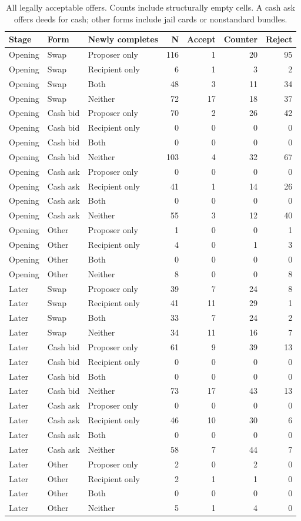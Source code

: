 \begin{longtable}{@{}lllrrrr@{}}
\caption{All legally acceptable offers. Counts include structurally empty cells. A cash ask offers deeds for cash; other forms include jail cards or nonstandard bundles.}\label{tab:full-offers}\\
\toprule Stage & Form & Newly completes & N & Accept & Counter & Reject\\\midrule\endhead
Opening & Swap & Proposer only & 116 & 1 & 20 & 95 \\
Opening & Swap & Recipient only & 6 & 1 & 3 & 2 \\
Opening & Swap & Both & 48 & 3 & 11 & 34 \\
Opening & Swap & Neither & 72 & 17 & 18 & 37 \\
Opening & Cash bid & Proposer only & 70 & 2 & 26 & 42 \\
Opening & Cash bid & Recipient only & 0 & 0 & 0 & 0 \\
Opening & Cash bid & Both & 0 & 0 & 0 & 0 \\
Opening & Cash bid & Neither & 103 & 4 & 32 & 67 \\
Opening & Cash ask & Proposer only & 0 & 0 & 0 & 0 \\
Opening & Cash ask & Recipient only & 41 & 1 & 14 & 26 \\
Opening & Cash ask & Both & 0 & 0 & 0 & 0 \\
Opening & Cash ask & Neither & 55 & 3 & 12 & 40 \\
Opening & Other & Proposer only & 1 & 0 & 0 & 1 \\
Opening & Other & Recipient only & 4 & 0 & 1 & 3 \\
Opening & Other & Both & 0 & 0 & 0 & 0 \\
Opening & Other & Neither & 8 & 0 & 0 & 8 \\
Later & Swap & Proposer only & 39 & 7 & 24 & 8 \\
Later & Swap & Recipient only & 41 & 11 & 29 & 1 \\
Later & Swap & Both & 33 & 7 & 24 & 2 \\
Later & Swap & Neither & 34 & 11 & 16 & 7 \\
Later & Cash bid & Proposer only & 61 & 9 & 39 & 13 \\
Later & Cash bid & Recipient only & 0 & 0 & 0 & 0 \\
Later & Cash bid & Both & 0 & 0 & 0 & 0 \\
Later & Cash bid & Neither & 73 & 17 & 43 & 13 \\
Later & Cash ask & Proposer only & 0 & 0 & 0 & 0 \\
Later & Cash ask & Recipient only & 46 & 10 & 30 & 6 \\
Later & Cash ask & Both & 0 & 0 & 0 & 0 \\
Later & Cash ask & Neither & 58 & 7 & 44 & 7 \\
Later & Other & Proposer only & 2 & 0 & 2 & 0 \\
Later & Other & Recipient only & 2 & 1 & 1 & 0 \\
Later & Other & Both & 0 & 0 & 0 & 0 \\
Later & Other & Neither & 5 & 1 & 4 & 0 \\\bottomrule\end{longtable}
